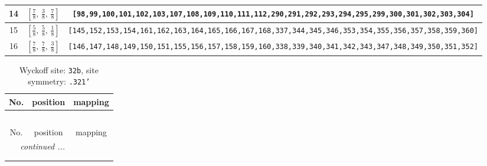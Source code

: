 \documentclass[fleqn,8pt]{jsarticle}
\begin{document}
\begin{longtable}{ccc}
14 & $\left[ \frac{7}{8},\, \frac{3}{8},\, \frac{7}{8} \right]$ & {\tt [98,99,100,101,102,103,107,108,109,110,111,112,290,291,292,293,294,295,299,300,301,302,303,304]} \\ \hline
15 & $\left[ \frac{5}{8},\, \frac{5}{8},\, \frac{1}{8} \right]$ & {\tt [145,152,153,154,161,162,163,164,165,166,167,168,337,344,345,346,353,354,355,356,357,358,359,360]} \\ \hline
16 & $\left[ \frac{7}{8},\, \frac{7}{8},\, \frac{3}{8} \right]$ & {\tt [146,147,148,149,150,151,155,156,157,158,159,160,338,339,340,341,342,343,347,348,349,350,351,352]} \\
\end{longtable}
\renewcommand{\arraystretch}{1.2}
\begin{longtable}{ccc}
\caption{Wyckoff site: {\tt 32b}, site symmetry: {\tt .321'}}
 \\
 \hline \hline
No. & position & mapping \\ \hline \endfirsthead

\multicolumn{2}{l}{\tablename\ \thetable{}} \\
 \hline \hline
No. & position & mapping \\ \hline \endhead

 \hline \hline
\multicolumn{2}{r}{\footnotesize\it continued ...} \\ \endfoot

 \hline \hline
\multicolumn{2}{r}{} \\ \endlastfoot


\end{longtable}
\end{document}
